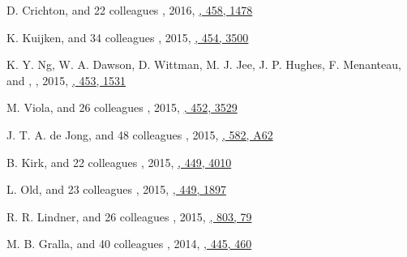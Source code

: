 \begin{etaremune}
\item
D. Crichton, and 22 colleagues
,
2016, \href{https://ui.adsabs.harvard.edu/abs/2016MNRAS.458.1478C}{\mnras, 458, 1478}

\item
K. Kuijken, and 34 colleagues
,
2015, \href{https://ui.adsabs.harvard.edu/abs/2015MNRAS.454.3500K}{\mnras, 454, 3500}

\item
K. Y. Ng, W. A. Dawson, D. Wittman, M. J. Jee, J. P. Hughes, F. Menanteau, and \myself,
,
2015, \href{https://ui.adsabs.harvard.edu/abs/2015MNRAS.453.1531N}{\mnras, 453, 1531}

\item
M. Viola, and 26 colleagues
,
2015, \href{https://ui.adsabs.harvard.edu/abs/2015MNRAS.452.3529V}{\mnras, 452, 3529}

\item
J. T. A. de Jong, and 48 colleagues
,
2015, \href{https://ui.adsabs.harvard.edu/abs/2015A&A...582A..62D}{\aap, 582, A62}

\item
B. Kirk, and 22 colleagues
,
2015, \href{https://ui.adsabs.harvard.edu/abs/2015MNRAS.449.4010K}{\mnras, 449, 4010}

\item
L. Old, and 23 colleagues
,
2015, \href{https://ui.adsabs.harvard.edu/abs/2015MNRAS.449.1897O}{\mnras, 449, 1897}

\item
R. R. Lindner, and 26 colleagues
,
2015, \href{https://ui.adsabs.harvard.edu/abs/2015ApJ...803...79L}{\apj, 803, 79}

\item
M. B. Gralla, and 40 colleagues
,
2014, \href{https://ui.adsabs.harvard.edu/abs/2014MNRAS.445..460G}{\mnras, 445, 460}


\end{etaremune}
